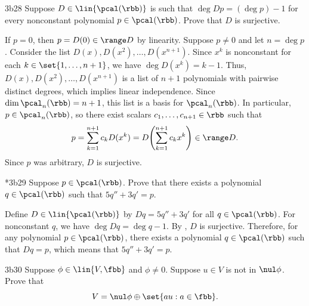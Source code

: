 \begin{exercise}{3b28}
    Suppose $D \in \lin{\pcal(\rbb)}$ is such that $\deg Dp = (\deg p) - 1$ for every nonconstant polynomial $p \in \pcal(\rbb)$.
	Prove that $D$ is surjective.
    
\end{exercise}

\begin{sol}
    If $p = 0$, then $p = D(0) \in \range D$ by linearity.
    Suppose $p \neq 0$ and let $n = \deg p$.
    Consider the list $D(x), D(x^2), \ldots, D(x^{n+1})$.
    Since $x^k$ is nonconstant for each $k \in \set{1, \ldots, n+1}$, we have $\deg D(x^k) = k - 1$.
    Thus, $D(x), D(x^2), \ldots, D(x^{n+1})$ is a list of $n + 1$ polynomials with pairwise distinct degrees, which implies linear independence.
    Since $\dim \pcal_n(\rbb) = n + 1$, this list is a basis for $\pcal_n(\rbb)$.
    In particular, $p \in \pcal_n(\rbb)$, so there exist scalars $c_1, \ldots, c_{n+1} \in \rbb$ such that
    \[
    	p = \sum_{k=1}^{n+1} c_k D(x^k) = D\!\left(\sum_{k=1}^{n+1} c_k x^k\right) \in \range D.
    \]
    Since $p$ was arbitrary, $D$ is surjective.
\end{sol}

\begin{exercise}*{3b29}
    Suppose $p \in \pcal(\rbb)$.
	Prove that there exists a polynomial $q \in \pcal(\rbb)$ such that $5q'' + 3q' = p$.
\end{exercise}

\begin{sol}
    Define $D \in \lin{\pcal(\rbb)}$ by $Dq = 5q'' + 3q'$ for all $q \in \pcal(\rbb)$. For nonconstant $q$, we have $\deg Dq = \deg q - 1$. By , $D$ is surjective. Therefore, for any polynomial $p \in \pcal(\rbb)$, there exists a polynomial $q \in \pcal(\rbb)$ such that $Dq = p$, which means that $5q'' + 3q' = p$.
\end{sol}

\begin{exercise}{3b30}
    Suppose $\phi \in \lin{V, \fbb}$ and $\phi \neq 0$.
	Suppose $u \in V$ is not in $\nul \phi$.
	Prove that
    \[
    	V = \nul \phi \oplus \set{au : a \in \fbb}.
    \]
\end{exercise}

